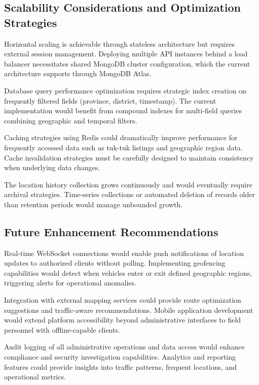 \documentclass[12pt,a4paper]{article}
\begin{document}
\subsection{Scalability Considerations and Optimization Strategies}

Horizontal scaling is achievable through stateless architecture but requires external session management. Deploying multiple API instances behind a load balancer necessitates shared MongoDB cluster configuration, which the current architecture supports through MongoDB Atlas.

Database query performance optimization requires strategic index creation on frequently filtered fields (province, district, timestamp). The current implementation would benefit from compound indexes for multi-field queries combining geographic and temporal filters.

Caching strategies using Redis could dramatically improve performance for frequently accessed data such as tuk-tuk listings and geographic region data. Cache invalidation strategies must be carefully designed to maintain consistency when underlying data changes.

The location history collection grows continuously and would eventually require archival strategies. Time-series collections or automated deletion of records older than retention periods would manage unbounded growth.

\subsection{Future Enhancement Recommendations}

Real-time WebSocket connections would enable push notifications of location updates to authorized clients without polling. Implementing geofencing capabilities would detect when vehicles enter or exit defined geographic regions, triggering alerts for operational anomalies.

Integration with external mapping services could provide route optimization suggestions and traffic-aware recommendations. Mobile application development would extend platform accessibility beyond administrative interfaces to field personnel with offline-capable clients.

Audit logging of all administrative operations and data access would enhance compliance and security investigation capabilities. Analytics and reporting features could provide insights into traffic patterns, frequent locations, and operational metrics.
\end{document}
